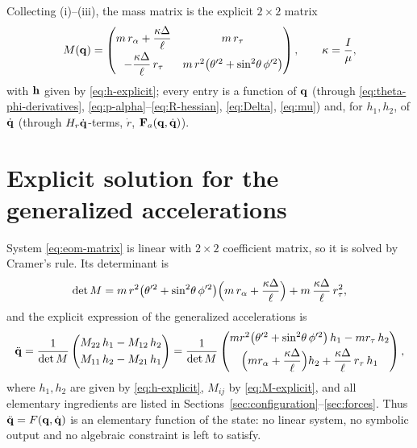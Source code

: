 \documentclass[10pt, a4paper]{article}
\begin{document}
Collecting (i)--(iii), the mass matrix is the explicit $2\times 2$ matrix
\begin{equation} \label{eq:M-explicit}
    M(\vb q)
    = \begin{pmatrix}
        m\,r_\alpha + \dfrac{\kappa\Delta}{\ell}
        & m\,r_\tau \\[2mm]
        -\dfrac{\kappa\Delta}{\ell}\,r_\tau
        & m\,r^2\bigl( \theta'^2 + \sin^2\!\theta\,\phi'^2 \bigr)
    \end{pmatrix},
    \qquad
    \kappa = \frac{I}{\mu},
\end{equation}
with $\vb h$ given by \eqref{eq:h-explicit}; every entry is a function of
$\vb q$ (through \eqref{eq:theta-phi-derivatives},
\eqref{eq:p-alpha}--\eqref{eq:R-hessian}, \eqref{eq:Delta},
\eqref{eq:mu}) and, for $h_1, h_2$, of $\dot{\vb q}$ (through $H_r\dot{\vb q}$-terms,
$\dot r$, $\vb F_a(\vb q, \dot{\vb q})$).

\section{Explicit solution for the generalized accelerations}
\label{sec:explicit-ddq}

System \eqref{eq:eom-matrix} is linear with $2\times 2$ coefficient matrix,
so it is solved by Cramer's rule.  Its determinant is
\begin{equation} \label{eq:det-M}
    \det M
    = m\,r^2\bigl( \theta'^2 + \sin^2\!\theta\,\phi'^2 \bigr)
    \Bigl( m\,r_\alpha + \frac{\kappa\Delta}{\ell} \Bigr)
    + m\,\frac{\kappa\Delta}{\ell}\,r_\tau^2 ,
\end{equation}
and the explicit expression of the generalized accelerations is
\begin{equation} \label{eq:ddq-final}
    \ddot{\vb q}
    = \frac{1}{\det M}
    \begin{pmatrix}
        M_{22}\, h_1 - M_{12}\, h_2 \\[1mm]
        M_{11}\, h_2 - M_{21}\, h_1
    \end{pmatrix}
    = \frac{1}{\det M}
    \begin{pmatrix}
        m r^2\bigl( \theta'^2 + \sin^2\!\theta\,\phi'^2 \bigr)\, h_1
        - m r_\tau\, h_2 \\[1mm]
        \Bigl( m r_\alpha + \dfrac{\kappa\Delta}{\ell} \Bigr) h_2
        + \dfrac{\kappa\Delta}{\ell}\,r_\tau\, h_1
    \end{pmatrix},
\end{equation}
where $h_1, h_2$ are given by \eqref{eq:h-explicit},
$M_{ij}$ by \eqref{eq:M-explicit}, and all elementary ingredients are
listed in Sections~\ref{sec:configuration}--\ref{sec:forces}.
Thus $\ddot{\vb q} = F(\vb q, \dot{\vb q})$ is an elementary function of the state: no
linear system, no symbolic output and no algebraic constraint is left to
satisfy.
\end{document}
